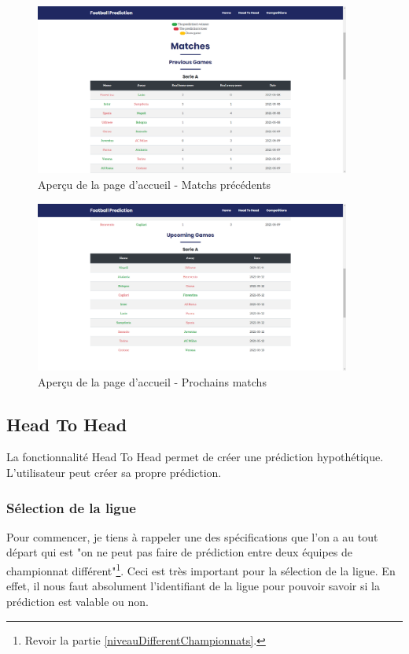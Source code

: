 \documentclass[a4paper,14pt]{extarticle}
\begin{document}
{\begin{figure}[htp]
    \centering
    \includegraphics[width=28em]{../img/previousGamesAccueil.png}
    \caption{Aperçu de la page d'accueil - Matchs précédents}
    \label{fig:previousGamesAccueil}
\end{figure}

\begin{figure}[htp]
    \centering
    \includegraphics[width=28em]{../img/upcomingGamesAccueil.png}
    \caption{Aperçu de la page d'accueil - Prochains matchs}
    \label{fig:upcomingGamesAccueil}
\end{figure}

\subsection{Head To Head}

La fonctionnalité Head To Head permet de créer une prédiction hypothétique. L'utilisateur peut créer sa propre prédiction.

\subsubsection{Sélection de la ligue}

Pour commencer, je tiens à rappeler une des spécifications que l'on a au tout départ qui est "on ne peut pas faire de prédiction entre deux équipes de championnat différent"\footnote{Revoir la partie \ref{niveauDifferentChampionnats}.}. Ceci est très important pour la sélection de la ligue. En effet, il nous faut absolument l'identifiant de la ligue pour pouvoir savoir si la prédiction est valable ou non.

}
\end{document}
